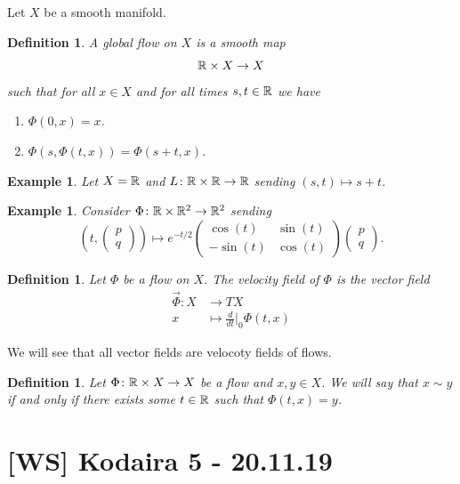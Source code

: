 \documentclass[A4paper, british, reqno]{amsart}
\theoremstyle{darkgreentheorem}
\theoremstyle{darkbluedefinition}
\newtheorem{defn}[thm]{Definition}
\theoremstyle{darkredexample}
\newtheorem{exa}[thm]{Example}
\theoremstyle{remark}
\newcommand{\1}{\mathbbm{1}}
\newcommand{\tms}{\times}
\begin{document}
Let $X$ be a smooth manifold.

\begin{defn}
    A \textit{global flow} on $X$ is a smooth map 
    \[ \R\tms X\to X \]
    such that for all $x\in X$ and for all times $s,t\in \mathbb{R}$ we have
    \begin{enumerate}[label=\roman*)]
	\item $\Phi(0,x)=x$.
	\item $\Phi(s,\Phi(t,x))=\Phi(s+t,x)$.
    \end{enumerate}
\end{defn}

\begin{exa}
    Let $X=\mathbb{R}$ and $L\colon \R\tms \R\to \R$ sending $(s,t)\mapsto s+t$.
\end{exa}

\begin{exa}
    Consider $\Phi\colon \R\tms \R^{2}\to \R^{2}$ sending
    \[ \left(t,\begin{pmatrix} p \\ q \end{pmatrix}\right)\mapsto e^{-t/2}\begin{pmatrix} \cos(t) & \sin(t) \\ -\sin(t) & \cos(t) \end{pmatrix} \begin{pmatrix} p \\ q \end{pmatrix}. \]
\end{exa}

\begin{defn}
    Let $\Phi$ be a flow on $X$.
    The \textit{velocity field} of $\Phi$ is the vector field
    \begin{align*}
	\vec{\Phi}\colon X&\longrightarrow TX \\
	x&\longmapsto \frac{d}{dt}|_{0}\Phi(t,x)
    \end{align*}
\end{defn}

We will see that all vector fields are velocoty fields of flows.

\begin{defn}
    Let $\Phi\colon \R\tms X\to X$ be a flow and $x,y\in X$.
    We will say that $x\sim y$ if and only if there exists some $t\in \mathbb{R}$ such that $\Phi(t,x)=y$.
\end{defn}

\section{[WS] Kodaira 5 - 20.11.19}
\end{document}
